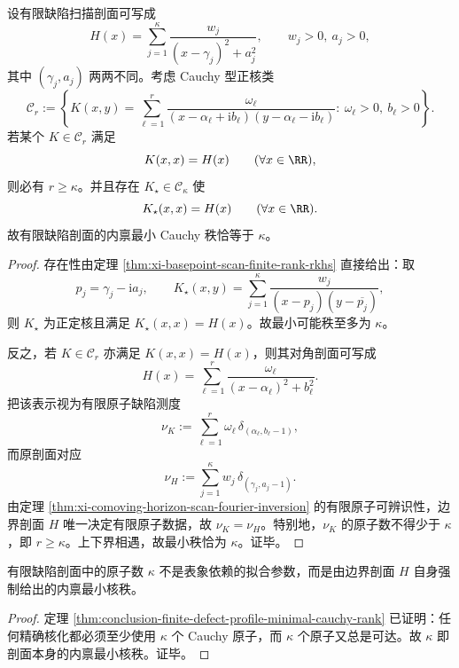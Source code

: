 \begin{theorem}\label{thm:conclusion-finite-defect-profile-minimal-cauchy-rank}
设有限缺陷扫描剖面可写成
\[
H(x)=\sum_{j=1}^{\kappa}\frac{w_j}{(x-\gamma_j)^2+a_j^2},
\qquad
w_j>0,\ a_j>0,
\]
其中 \((\gamma_j,a_j)\) 两两不同。考虑 Cauchy 型正核类
\[
\mathcal C_r:=
\left\{
K(x,y)=\sum_{\ell=1}^{r}
\frac{\omega_\ell}{(x-\alpha_\ell+\mathrm{i}b_\ell)(y-\alpha_\ell-\mathrm{i}b_\ell)}:
\ \omega_\ell>0,\ b_\ell>0
\right\}.
\]
若某个 \(K\in\mathcal C_r\) 满足
\[
K(x,x)=H(x)\qquad(\forall x\in\RR),
\]
则必有 \(r\ge \kappa\)。并且存在 \(K_\star\in\mathcal C_\kappa\) 使
\[
K_\star(x,x)=H(x)\qquad(\forall x\in\RR).
\]
故有限缺陷剖面的内禀最小 Cauchy 秩恰等于 \(\kappa\)。
\end{theorem}
\begin{proof}
存在性由定理 \ref{thm:xi-basepoint-scan-finite-rank-rkhs} 直接给出：取
\[
p_j=\gamma_j-\mathrm{i}a_j,
\qquad
K_\star(x,y)=\sum_{j=1}^{\kappa}\frac{w_j}{(x-p_j)(y-\overline{p_j})},
\]
则 \(K_\star\) 为正定核且满足 \(K_\star(x,x)=H(x)\)。故最小可能秩至多为 \(\kappa\)。

反之，若 \(K\in\mathcal C_r\) 亦满足 \(K(x,x)=H(x)\)，则其对角剖面可写成
\[
H(x)=\sum_{\ell=1}^{r}\frac{\omega_\ell}{(x-\alpha_\ell)^2+b_\ell^2}.
\]
把该表示视为有限原子缺陷测度
\[
\nu_K:=\sum_{\ell=1}^{r}\omega_\ell\,\delta_{(\alpha_\ell,b_\ell-1)},
\]
而原剖面对应
\[
\nu_H:=\sum_{j=1}^{\kappa}w_j\,\delta_{(\gamma_j,a_j-1)}.
\]
由定理 \ref{thm:xi-comoving-horizon-scan-fourier-inversion} 的有限原子可辨识性，边界剖面 \(H\) 唯一决定有限原子数据，故 \(\nu_K=\nu_H\)。特别地，\(\nu_K\) 的原子数不得少于 \(\kappa\)，即 \(r\ge \kappa\)。上下界相遇，故最小秩恰为 \(\kappa\)。证毕。
\end{proof}

\begin{corollary}[有限缺陷剖面的内禀最小核秩]\label{cor:conclusion-finite-defect-profile-intrinsic-minimal-rank}
有限缺陷剖面中的原子数 \(\kappa\) 不是表象依赖的拟合参数，而是由边界剖面 \(H\) 自身强制给出的内禀最小核秩。
\end{corollary}
\begin{proof}
定理 \ref{thm:conclusion-finite-defect-profile-minimal-cauchy-rank} 已证明：任何精确核化都必须至少使用 \(\kappa\) 个 Cauchy 原子，而 \(\kappa\) 个原子又总是可达。故 \(\kappa\) 即剖面本身的内禀最小核秩。证毕。
\end{proof}

